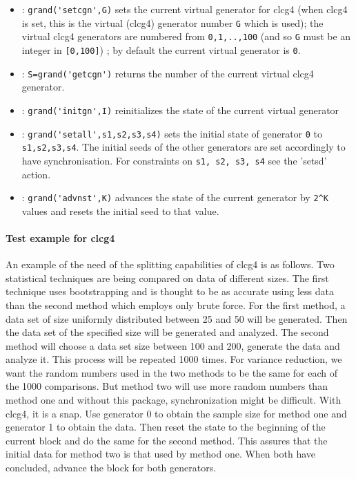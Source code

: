 \begin{itemize}
\item {} : \verb!grand('setcgn',G)! sets the current virtual generator for clcg4 (when clcg4
  is set, this is the virtual (clcg4) generator number \verb!G! which is used);  the virtual clcg4 
  generators are numbered from \verb!0,1,..,100! (and so \verb!G! must be an integer 
  in  \verb![0,100]!) ; by default the current virtual generator is \verb!0!.
\item {} : \verb!S=grand('getcgn')! returns the number of the current virtual clcg4 generator.
\item {} : \verb!grand('initgn',I)! reinitializes the state of the current virtual generator
\item {} : \verb!grand('setall',s1,s2,s3,s4)! sets the initial state of generator \verb!0! 
  to \verb!s1,s2,s3,s4!. The initial seeds of the other generators are set accordingly 
  to have synchronisation. For constraints on \verb!s1, s2, s3, s4! see the 'setsd' action.
\item {} : \verb!grand('advnst',K)! advances the state of the current generator by \verb!2^K! values 
  and  resets the initial seed to that value. 
\end{itemize}



\paragraph{Test example for clcg4}

An example of  the  need of the splitting capabilities of clcg4 is as  follows. 
Two statistical techniques are being compared on  data of  different sizes. The first 
technique uses   bootstrapping  and is   thought to   be  as accurate using less data   
than the second method   which  employs only brute force.  For the first method, a data
set of size uniformly distributed between 25 and 50 will be generated.  Then the data set  
of the specified size will be generated and analyzed.  The second method will  choose a 
data set size between 100 and 200, generate the data  and analyze it.  This process will 
be repeated 1000 times.  For  variance reduction, we  want the  random numbers  used in the 
two methods to be the  same for each of  the 1000 comparisons.  But method two will  use more
random  numbers than   method one and  without this package, synchronization might be difficult.  
With clcg4, it is a snap.  Use generator 0 to obtain  the sample size for  method one and 
generator 1  to obtain the  data.  Then reset the state to the beginning  of the current  block
and do the same  for the second method.  This assures that the initial data  for method two is 
that used by  method  one.  When both  have concluded,  advance the block for both generators.

